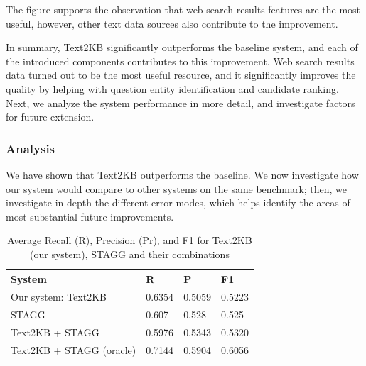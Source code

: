 The figure supports the observation that web search results features are the most useful, however, other text data sources also contribute to the improvement.

In summary, Text2KB significantly outperforms the baseline system, and each of the introduced components contributes to this improvement.
Web search results data turned out to be the most useful resource, and it significantly improves the quality by helping with question entity identification and candidate ranking.
Next, we analyze the system performance in more detail, and investigate factors for future extension.

\subsubsection{Analysis}
\label{subsubsec:text2kb:analysis}

We have shown that Text2KB outperforms the baseline.
We now investigate how our system would compare to other systems on the same benchmark; then, we investigate in depth the different error modes, which helps identify the areas of most substantial future improvements. 



\begin{table}
\centering
\caption{Average Recall (R), Precision (Pr), and F1 for Text2KB (our system), STAGG and their combinations}
\label{table:text2kb:combine_stagg}
\begin{tabular}{| p{4cm} | p{1cm} | p{1cm} | p{1cm} | }
\hline
System & R & P & F1 \\
\hline
Our system: Text2KB & 0.6354 & 0.5059 & 0.5223 \\
STAGG \cite{yih:ACL:2015:STAGG} & 0.607 & 0.528 & 0.525\\
\hline
Text2KB + STAGG & 0.5976 & 0.5343 & 0.5320 \\
Text2KB + STAGG (oracle) & 0.7144 & 0.5904 & 0.6056 \\
\hline
\end{tabular}
\end{table}

